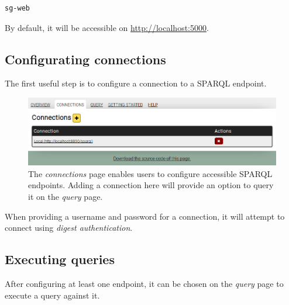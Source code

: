 \documentclass[11pt,a4paper,oneside]{book}
\begin{document}
\begin{siderules}
\begin{verbatim}
sg-web
\end{verbatim}
\end{siderules}

  By default, it will be accessible on \url{http://localhost:5000}.

\subsection{Configurating connections}

  The first useful step is to configure a connection to a SPARQL endpoint.

  \begin{figure}[h]
    \begin{center}
      \includegraphics[width=1.0\textwidth]{figures/web-connections.png}
    \end{center}
    \caption{The \emph{connections} page enables users to configure accessible
      SPARQL endpoints.  Adding a connection here will provide an option to
      query it on the \emph{query} page.}
    \label{fig:web-connections}
  \end{figure}

  When providing a username and password for a connection, it will attempt
  to connect using \emph{digest authentication}.

\subsection{Executing queries}

  After configuring at least one endpoint, it can be chosen on the \emph{query}
  page to execute a query against it.
\end{document}
